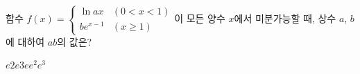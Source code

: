함수 $f(x)=\begin{cases} \ln ax & (0<x<1) \\ be^{x-1} & (x\ge 1) \end{cases}$이 모든 양수 $x$에서 미분가능할 때, 상수 $a$, $b$에 대하여 $ab$의 값은? 
\begin{choices32}{$e$}{$2e$}{$3e$}{$e^2$}{$e^3$}\end{choices32}
